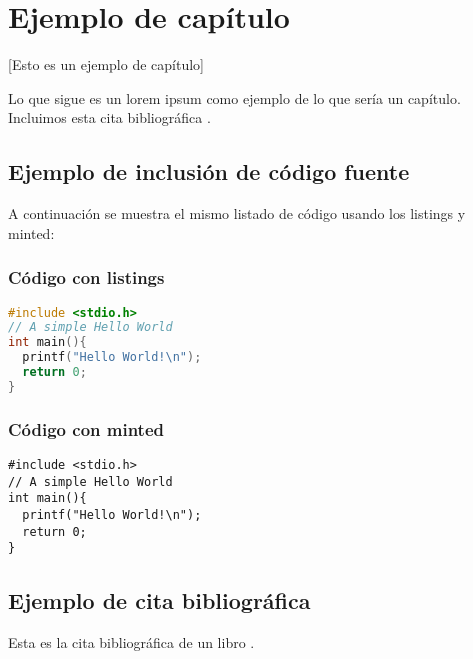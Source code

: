 \chapter{Ejemplo de capítulo}

[Esto es un ejemplo de capítulo]

Lo que sigue es un lorem ipsum como ejemplo de lo que sería un capítulo. Incluimos esta cita bibliográfica \cite{recomendaciones}.

\lipsum

\section{Ejemplo de inclusión de código fuente}

A continuación se muestra el mismo listado de código usando los listings y minted:


\subsection{Código con listings}

\begin{lstlisting}[language=c]
#include <stdio.h>
// A simple Hello World
int main(){
  printf("Hello World!\n");
  return 0;
}
\end{lstlisting}

\subsection{Código con minted}

\begin{verbatim}
#include <stdio.h>
// A simple Hello World
int main(){
  printf("Hello World!\n");
  return 0;
}
\end{verbatim}

\section{Ejemplo de cita bibliográfica}

Esta es la cita bibliográfica de un libro \cite{ec}.

